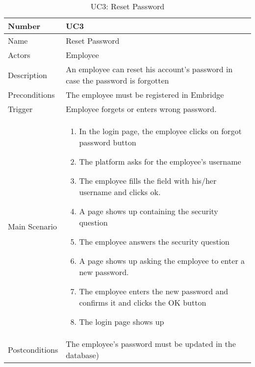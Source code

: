 \documentclass[12pt,a4paper]{article}
\begin{document}
\begin{table}[h]
\centering
\caption{UC3: Reset Password}
\label{tab:ucm1}
\begin{tabularx}{\textwidth}{@{}lX@{}}
\toprule
Number & UC3 \\ \midrule
Name & Reset Password \\
Actors & Employee\\
Description &
An employee can reset his account’s password in case the password is forgotten\\
Preconditions & The employee must be registered in Embridge \\
Trigger & Employee forgets or enters wrong password.\\
Main Scenario & 
\begin{enumerate}
\item In the login page, the employee clicks on forgot password button
\item The platform asks for the employee’s username
\item The employee fills the field with his/her username and clicks ok.
\item A page shows up containing the security question
\item The employee answers the security question
\item A page shows up asking the employee to enter a new password.
\item The employee enters the new password and confirms it and clicks the OK button
\item The login page shows up  
\end{enumerate} \\
Postconditions & The employee’s password must be updated in the database) \\
\bottomrule
\end{tabularx}
\end{table}
\end{document}

